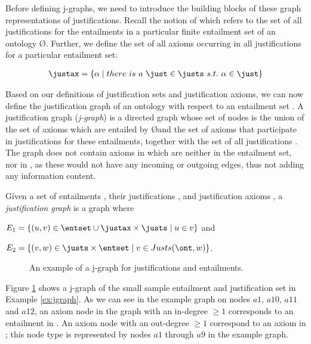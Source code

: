 Before defining j-graphs, we need to introduce the building blocks of these graph representations of justifications. Recall the notion of \justs which refers to the set of all justifications for the entailments in a particular finite entailment set of an ontology \O. Further, we define the set of all axioms occurring in all justifications for a particular entailment set:
\begin{defn}
\begin{align*}
\justax = \{\alpha \mid there~is~a~ \just \in \justs ~s.t.~\alpha \in \just\}
\end{align*}
\end{defn}
Based on our definitions of justification sets and justification axioms, we can now define the justification graph of an ontology \ont with respect to an entailment set \entset. A justification graph (\emph{j-graph}) \jgraph is a directed graph whose set of nodes is the union of the set of axioms \entset which are entailed by \O and the set \justax of axioms that participate in justifications for these entailments, together with the set of all justifications \justs. The graph does not contain axioms in \ont which are neither in the entailment set, nor in \justax, as these would not have any incoming or outgoing edges, thus not adding any information content.
\begin{defn}
Given a set of entailments \entset, their justifications \justs, and justification axioms \justax, a \emph{justification graph} is a graph \jgraphdef where
\begin{compactitem}
\item $E_{1} =\{ (u,v) \in \entset \cup \justax \times \justs \mid u \in v\}$  and\\
\item $E_{2} =\{ (v,w) \in \justs\times \entset \mid v \in Justs(\ont, w) \}$.
\end{compactitem}
\end{defn}

\begin{figure}
\centering
{}
\caption{An example of a j-graph for justifications and entailments.}\label{fig:jgraphexample}
\end{figure}
Figure \ref{fig:jgraphexample} shows a j-graph of the small sample entailment and justification set in Example \ref{ex:jgraph}. As we can see in the example graph on nodes $a1$, $a10$, $a11$ and $a12$, an axiom node in the graph with an in-degree $\geq 1$ corresponds to an entailment in \entset. An axiom node with an out-degree $\geq 1$ correspond to an axiom in \justax; this node type is represented by nodes $a1$ through $a9$ in the example graph.

